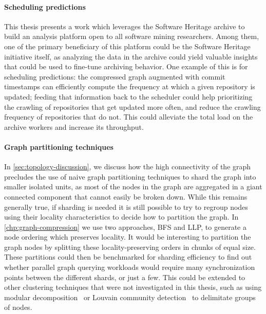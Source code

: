 \paragraph*{Scheduling predictions}

This thesis presents a work which leverages the Software Heritage archive to
build an analysis platform open to all software mining researchers. Among them,
one of the primary beneficiary of this platform could be the Software Heritage
initiative itself, as analyzing the data in the archive could yield valuable
insights that could be used to fine-tune archiving behavior. One example of
this is for scheduling predictions: the compressed graph augmented with commit
timestamps can efficiently compute the frequency at which a given repository is
updated; feeding that information back to the scheduler could help prioritizing
the crawling of repositories that get updated more often, and reduce the
crawling frequency of repositories that do not. This could alleviate the total
load on the archive workers and increase its throughput.

\paragraph*{Graph partitioning techniques}

In \cref{sec:topology-discussion}, we discuss how the high connectivity of the
graph precludes the use of naive graph partitioning techniques to shard the
graph into smaller isolated units, as most of the nodes in the graph are
aggregated in a giant connected component that cannot easily be broken down.
While this remains generally true, if sharding is needed it is still possible
to try to regroup nodes using their locality characteristics to decide how to
partition the graph. In \cref{chp:graph-compression} we use two approaches,
\gls{BFS} and \gls{LLP}, to generate a node ordering which preserves locality.
It would be interesting to partition the graph nodes by splitting these
locality-preserving orders in chunks of equal size. These partitions could then
be benchmarked for sharding efficiency to find out whether parallel graph
querying workloads would require many synchronization points between the
different shards, or just a few. This could be extended to other clustering
techniques that were not investigated in this thesis, such as using modular
decomposition~\cite{gallai1967transitiv,mcconnell2005linear,NABTI201763} or
Louvain community detection~\cite{blondel2008fast} to delimitate groups of
nodes.

